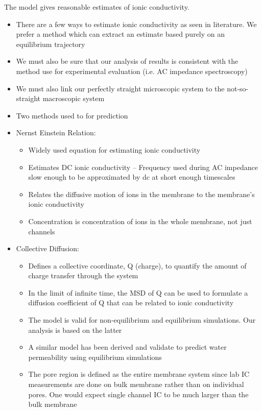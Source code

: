 \documentclass{article}
\begin{document}
	The model gives reasonable estimates of ionic conductivity.
	\begin{itemize}
		\item There are a few ways to estimate ionic conductivity as seen in literature. We prefer a method which can extract an estimate based purely on an equilibrium trajectory
		\item We must also be sure that our analysis of results is consistent with the method use for experimental evaluation (i.e. AC impedance spectroscopy)
		\item We must also link our perfectly straight microscopic system to the not-so-straight macroscopic system
		\item Two methods used to for prediction
		\item Nernst Einstein Relation:
		\begin{itemize}
			\item Widely used equation for estimating ionic conductivity
			\item Estimates DC ionic conductivity -- Frequency used during AC impedance slow enough to be approximated by dc at short enough timescales
			\item Relates the diffusive motion of ions in the membrane to the membrane's ionic conductivity
			\item Concentration is concentration of ions in the whole membrane, not just channels
		\end{itemize}
		\item Collective Diffusion:
		\begin{itemize}
			\item Defines a collective coordinate, Q (charge), to quantify the amount of charge transfer through the system
			\item In the limit of infinite time, the MSD of Q can be used to formulate a diffusion coefficient of Q that can be related to ionic conductivity
			\item The model is valid for non-equilibrium and equilibrium simulations. Our analysis is based on the latter
			\item A similar model has been derived and validate to predict water permeability using equilibrium simulations
			\item The pore region is defined as the entire membrane system since lab IC measurements are done on bulk membrane rather than on individual pores. One would expect single channel IC to be much larger than the bulk membrane
                \end{itemize}                    
	\end{itemize}
\end{document}
